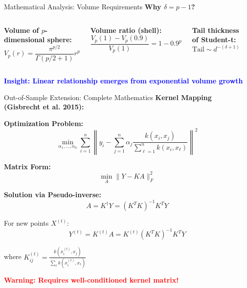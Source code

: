 \documentclass[aspectratio=169]{beamer}
\newcommand{\conceptbox}[2]{\colorbox{#1!20}{\textcolor{#1}{\textbf{#2}}}}
\newcommand{\warning}[1]{\conceptbox{red}{Warning: #1}}
\newcommand{\insight}[1]{\conceptbox{blue}{Insight: #1}}
\begin{document}
\begin{frame}{Mathematical Analysis: Volume Requirements}
\textbf{Why $\delta = p - 1$?}

\begin{columns}
\textbf{Volume of $p$-dimensional sphere:}
$$V_p(r) = \frac{\pi^{p/2}}{\Gamma(p/2 + 1)}r^p$$

\textbf{Volume ratio (shell):}
$$\frac{V_p(1) - V_p(0.9)}{V_p(1)} = 1 - 0.9^p$$

\textbf{Tail thickness of Student-t:}
$$\text{Tail} \sim d^{-(\delta+1)}$$

\begin{center}
\end{center}
\end{columns}

\insight{Linear relationship emerges from exponential volume growth}
\end{frame}

\begin{frame}{Out-of-Sample Extension: Complete Mathematics}
\textbf{Kernel Mapping (Gisbrecht et al. 2015):}

\textbf{Optimization Problem:}
$$\min_{\alpha_1,...,\alpha_n} \sum_{i=1}^n \left\|y_i - \sum_{j=1}^n \alpha_j \frac{k(x_i, x_j)}{\sum_{\ell=1}^n k(x_i, x_\ell)}\right\|^2$$

\textbf{Matrix Form:}
$$\min_A \|Y - KA\|_F^2$$

\textbf{Solution via Pseudo-inverse:}
$$A = K^{\dagger}Y = (K^TK)^{-1}K^TY$$

For new points $X^{(t)}$:
$$Y^{(t)} = K^{(t)}A = K^{(t)}(K^TK)^{-1}K^TY$$

where $K^{(t)}_{ij} = \frac{k(x_i^{(t)}, x_j)}{\sum_\ell k(x_i^{(t)}, x_\ell)}$

\warning{Requires well-conditioned kernel matrix!}
\end{frame}
\end{document}
